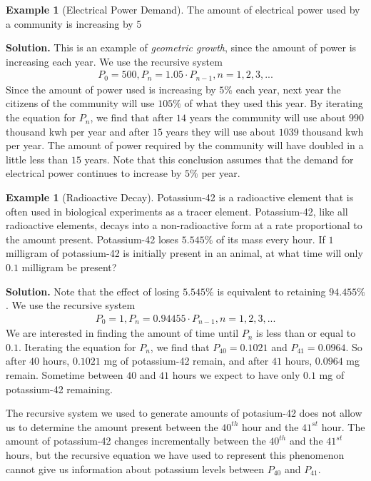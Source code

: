 \documentclass[10pt,]{book}
\theoremstyle{plain}
\theoremstyle{definition}
\theoremstyle{definition}
\newtheorem{example}[theorem]{Example}
\theoremstyle{definition}
\numberwithin{equation}{section}
\begin{document}
\begin{example}[Electrical Power Demand]\label{example-electrical-power-demand}
\hypertarget{p-73}{}%
The amount of electrical power used by a community is increasing by 5%
\par\smallskip%
\noindent\textbf{Solution.}\hypertarget{solution-5}{}\quad%
\hypertarget{p-74}{}%
This is an example of \emph{geometric growth}, since the amount of power is increasing each year. We use the recursive system%
%
\begin{gather*}
P_0=500, P_n=1.05 \cdot P_{n-1}, n=1,2,3,...
\end{gather*}
\hypertarget{p-75}{}%
Since the amount of power used is increasing by \(5\%\) each year, next year the citizens of the community will use \(105\%\) of what they used this year.  By iterating the equation for \(P_n\), we find that after \(14\) years the community will use about \(990\) thousand kwh per year and after \(15\) years they will use about \(1039\) thousand kwh per year.  The amount of power required by the community will have doubled in a little less than \(15\) years.  Note that this conclusion assumes that the demand for electrical power continues to increase by \(5\%\) per year.%
\end{example}
\begin{example}[Radioactive Decay]\label{example-radioactive-decay}
\hypertarget{p-76}{}%
Potassium-42 is a radioactive element that is often used in biological experiments as a tracer element.  Potassium-42, like all radioactive elements, decays into a non-radioactive form at a rate proportional to the amount present.  Potassium-42 loses \(5.545\%\) of its mass every hour.  If \(1\) milligram of potassium-42 is initially present in an animal, at what time will only \(0.1\) milligram be present?%
\par\smallskip%
\noindent\textbf{Solution.}\hypertarget{solution-6}{}\quad%
\hypertarget{p-77}{}%
Note that the effect of losing \(5.545\%\) is equivalent to retaining \(94.455\%\). We use the recursive system%
%
\begin{gather*}
P_0=1, P_n=0.94455 \cdot P_{n-1}, n=1,2,3,...
\end{gather*}
\hypertarget{p-78}{}%
We are interested in finding the amount of time until \(P_n\) is less than or equal to \(0.1\).  Iterating the equation for \(P_n\), we find that \(P_{40} = 0.1021\) and \(P_{41} = 0.0964\). So after \(40\) hours, \(0.1021\) mg of potassium-42 remain, and after \(41\) hours, \(0.0964\) mg remain. Sometime between \(40\) and \(41\) hours we expect to have only \(0.1\) mg of potassium-42 remaining.%
\par
\hypertarget{p-79}{}%
The recursive system we used to generate amounts of potasium-42 does not allow us to determine the amount present between the \(40^{th}\) hour and the \(41^{st}\) hour.  The amount of potassium-42 changes incrementally between the \(40^{th}\) and the \(41^{st}\) hours, but the recursive equation we have used to represent this phenomenon cannot give us information about potassium levels between \(P_{40}\) and \(P_{41}\).%
\end{example}
\end{document}
